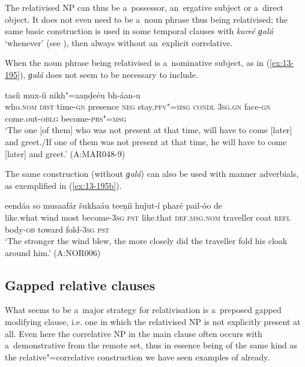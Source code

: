 

The relativised NP can thus be a~possessor, an~ergative subject or a~direct object. It does not even need to be a~noun phrase thus being relativised; the same basic construction is used in some temporal clauses with \textit{kareé ɡalá} `whenever' (see ), then always without an~explicit correlative.


When the noun phrase being relativised is a~nominative subject, as in (\ref{ex:13-195}), \textit{ɡalá} does not seem to be necessary to include. 

\begin{exe}
\ex
\label{ex:13-195}
 tasíi mux-íi nikh"=aaṇḍeéu bh-áan-u \\
who.\textsc{nom} \textsc{dist} time-\textsc{gn} presence \textsc{neg} stay.\textsc{pfv"=msg}  \textsc{condl } \textsc{3sg.gn} face-\textsc{gn} come.out-\textsc{oblg} become-\textsc{prs"=msg} \\
\glt `The one [of them] who was not present at that time, will have to come [later] and greet./If one of them was not present at that time, he will have to come [later] and greet.' (A:MAR048-9)
\end{exe}

The same construction (without \textit{ɡalá}) can also be used with manner adverbials, as exemplified in (\ref{ex:13-195b}).

\begin{exe}
\ex
\label{ex:13-195b}
 eendáa so musaafár šukhaáu teeṇíi huǰut-í pharé pail-óo de\\
like.what wind most become-\textsc{3sg} \textsc{pst} like.that \textsc{def.msg.nom} traveller coat \textsc{refl} body-\textsc{ob} toward fold-\textsc{3sg} \textsc{pst} \\
\glt `The stronger the wind blew, the more closely did the traveller fold his cloak around him.' (A:NOR006)
\end{exe}


\subsection{Gapped relative clauses}
\label{subsec:13-6-3}


What seems to be a~major strategy for relativisation is a~preposed gapped modifying clause, i.e. one in which the relativised NP is not explicitly present at all. Even here the correlative NP in the main clause often occurs with a~demonstrative from the remote set, thus in essence being of the same kind as the relative"=correlative construction we have seen examples of already.


